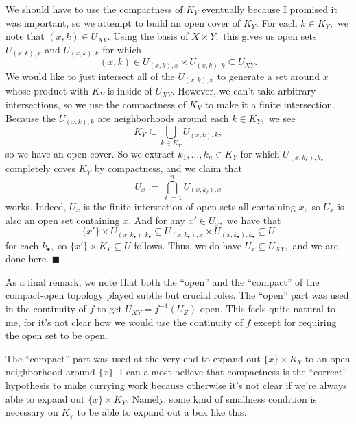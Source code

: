 We should have to use the compactness of $K_Y$ eventually because I promised it was important, so we attempt to build an open cover of $K_Y.$ For each $k\in K_Y,$ we note that $(x,k)\in U_{XY}.$ Using the basis of $X\times Y,$ this gives us open sets $U_{(x,k),x}$ and $U_{(x,k),k}$ for which
\[(x,k)\in U_{(x,k),x}\times U_{(x,k),k}\subseteq U_{XY}.\]
We would like to just intersect all of the $U_{(x,k),x}$ to generate a set around $x$ whose product with $K_Y$ is inside of $U_{XY}.$ However, we can't take arbitrary intersections, so we use the compactness of $K_Y$ to make it a finite intersection. Because the $U_{(x,k),k}$ are neighborhoods around each $k\in K_Y,$ we see
\[K_Y\subseteq\bigcup_{k\in K_Y}U_{(x,k),k},\]
so we have an open cover. So we extract $k_1,\ldots,k_n\in K_Y$ for which $U_{(x,k_\bullet),k_\bullet}$ completely coves $K_Y$ by compactness, and we claim that
\[U_x:=\bigcap_{\ell=1}^nU_{(x,k_\ell),x}\]
works. Indeed, $U_x$ is the finite intersection of open sets all containing $x,$ so $U_x$ is also an open set containing $x.$ And for any $x'\in U_x,$ we have that
\[\{x'\}\times U_{(x,k_\bullet),k_\bullet}\subseteq U_{(x,k_\bullet),x}\times U_{(x,k_\bullet),k_\bullet}\subseteq U\]
for each $k_\bullet,$ so $\{x'\}\times K_Y\subseteq U$ follows. Thus, we do have $U_x\subseteq U_{XY},$ and we are done here. $\blacksquare$

As a final remark, we note that both the ``open'' and the ``compact'' of the compact-open topology played subtle but crucial roles. The ``open'' part was used in the continuity of $f$ to get $U_{XY}=f^{-1}(U_Z)$ open. This feels quite natural to me, for it's not clear how we would use the continuity of $f$ except for requiring the open set to be open.

The ``compact'' part was used at the very end to expand out $\{x\}\times K_Y$ to an open neighborhood around $\{x\}.$ I can almost believe that compactness is the ``correct'' hypothesis to make currying work because otherwise it's not clear if we're always able to expand out $\{x\}\times K_Y.$ Namely, some kind of smallness condition is necessary on $K_Y$ to be able to expand out a box like this.

